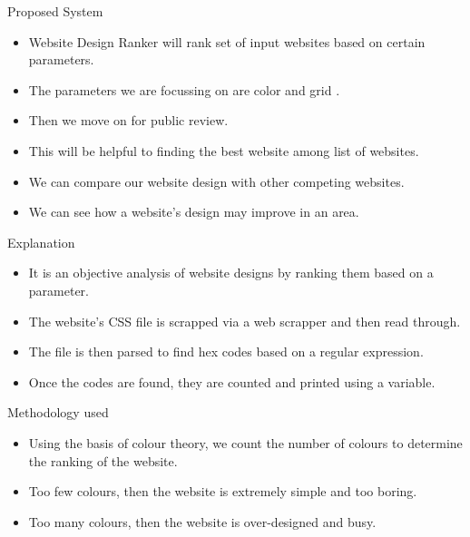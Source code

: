 \documentclass[11pt]{beamer}
\begin{document}
	\begin{frame}{Proposed System}
			\begin{itemize}
			\item Website Design Ranker will rank set of input websites based on certain parameters.
			\item The parameters we are focussing on are color and grid .
			\item Then we move on for public review.
			\item This will be helpful to finding the best website among list of websites.
			\item We can compare our website design with other competing websites.
			\item We can see how a website's design may improve in an area.

			\end{itemize}
	\end{frame}
	\begin{frame}{Explanation }
		\begin{itemize}
			\item It is an objective analysis of website designs by ranking them based on a parameter.
			\item The website's CSS file is scrapped via a web scrapper and then read through.
			\item The file is then parsed to find hex codes based on a regular expression.
			\item Once the codes are found, they are counted and printed using a variable.
		\end{itemize}
	\end{frame}
		\begin{frame}{Methodology used}
	\begin{itemize}
		\item Using the basis of colour theory, we count the number of colours to determine the ranking of the website.
		\item Too few colours, then the website is extremely simple and too boring.
		\item Too many colours, then the website is over-designed and busy. 
	\end{itemize}
	\end{frame}
\end{document}
